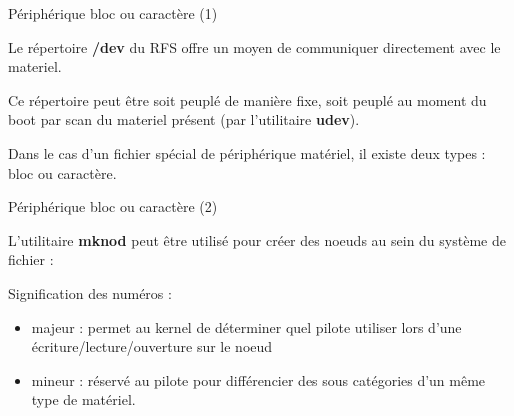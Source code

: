 \documentclass[12pt, t]{beamer}
\newcommand{\bi}{\begin{itemize}}
\newcommand{\ei}{\end{itemize}}
\begin{document}
\begin{frame}{Périphérique bloc ou caractère (1)}

    \vspace{20pt}
    Le répertoire {\textbf{/dev}} du RFS offre un moyen de communiquer
    directement avec le materiel.

    {
        \vspace{20pt}
        Ce répertoire peut être soit peuplé de manière fixe, soit peuplé au moment
        du boot par scan du materiel présent (par l'utilitaire {\textbf{udev}}).
    }

    {
        \vspace{20pt}
        Dans le cas d'un fichier spécial de périphérique matériel, il existe deux
        types : bloc ou caractère.
    }

\end{frame}


\begin{frame}{Périphérique bloc ou caractère (2)}

    \vspace{10pt}
    L'utilitaire {\textbf{mknod}} peut être utilisé pour créer des noeuds au
    sein du système de fichier :

    \vspace{10pt}
    \lstnod

    {
        Signification des numéros :
        \bi
        \item majeur : permet au kernel de déterminer quel pilote utiliser lors
              d'une écriture/lecture/ouverture sur le noeud
        \item mineur : réservé au pilote pour différencier des sous catégories
              d'un même type de matériel.
        \ei
    }

\end{frame}
\end{document}
